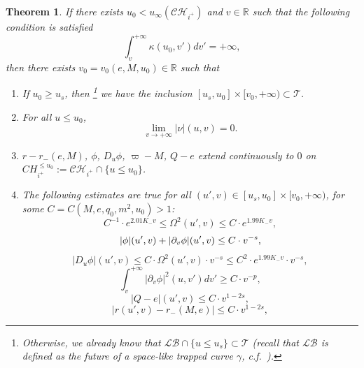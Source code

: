 \documentclass[10pt,a4paper]{article}
\theoremstyle{plain}
\newtheorem{thm}{Theorem}[section]
\theoremstyle{remark}
\theoremstyle{definition}
\newcommand{\RR}{\mathbb{R}}
\theoremstyle{plain}
\theoremstyle{remark}
\theoremstyle{definition}
\newcommand{\CH}{\mathcal{CH}_{i^+}}
\numberwithin{equation}{section}
\begin{document}
\begin{thm} \label{classificationtheorem} If there exists $u_0 <u_{\infty}(\CH)$ and $v \in \RR$ such that the following condition is satisfied \begin{equation} \label{MihalisPHDcondition}
	\int_{v}^{+\infty} \kappa(u_0,v')dv' = +\infty,\end{equation} then there exists $v_0=v_0(e,M,u_0) \in \RR$ such that \begin{enumerate}
		\item \label{class1} If $u_0 \geq u_s$, then \footnote{Otherwise, we already know that $\mathcal{LB} \cap \{u \leq u_s\} \subset \mathcal{T}$ (recall that $\mathcal{LB}$ is defined as the future of a space-like trapped curve $\gamma$, c.f.\ \cite{Moi}).\color{black}} we have the inclusion $[u_s,u_0] \times [v_0,+\infty) \subset \mathcal{T}$.
		\item \label{secondeasy} For all $u \leq u_0$, $$\lim_{v \rightarrow +\infty}|\nu|(u,v)=0.$$
		\item $r-r_-(e,M)$, $\phi$, $D_u \phi$, $\varpi-M$, $Q-e$ extend continuously to $0$ on $CH^{\leq u_0}_{i^+}:=\CH \cap \{ u \leq u_0\}$.
		\item The following estimates are true for all $(u',v) \in [u_s,u_0] \times [v_0,+\infty)$, for some $C=C(M,e,q_0,m^2,u_0)>1$: \begin{equation}\label{rigidity1}
		C^{-1} \cdot e^{2.01 K_- v}\leq 	\Omega^2(u',v) \leq  C \cdot e^{1.99K_- v}, 	\end{equation}  \begin{equation} \label{rigidity2}
	| \phi|(u',v)+	\color{black}	|\partial_v \phi|(u',v) \leq  C \cdot v^{-s},
		\end{equation}  \begin{equation} \label{rigidity3}
			|D_u \phi|(u',v)\leq  C \cdot \Omega^2(u',v) \cdot v^{-s} \leq  C^2 \cdot e^{1.99K_- v} \cdot v^{-s},
		\end{equation}  	\begin{equation} \label{rigidity4}
		\int_{v}^{+\infty} |\partial_v \phi|^2(u,v') dv' \geq  C \cdot v^{-p},			\end{equation}\begin{equation} \label{rigidity5}
		|Q-e|(u',v) \leq  C \cdot v^{1-2s},
		\end{equation}\begin{equation} \label{rigidity6}
		|r(u',v)-r_-(M,e)| \leq  C \cdot v^{1-2s},
		\end{equation}
		\begin{equation} \label{rigidity7}

\end{equation}
\end{enumerate}
\end{thm}
\end{document}
